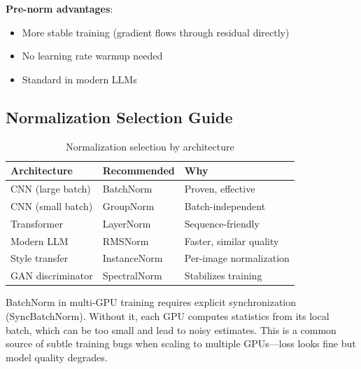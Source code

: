 \textbf{Pre-norm advantages}:
\begin{itemize}
    \item More stable training (gradient flows through residual directly)
    \item No learning rate warmup needed
    \item Standard in modern LLMs
\end{itemize}

\subsection{Normalization Selection Guide}

\begin{table}[H]
\centering
\caption{Normalization selection by architecture}
\begin{tabularx}{\textwidth}{lXX}
\toprule
\textbf{Architecture} & \textbf{Recommended} & \textbf{Why} \\
\midrule
CNN (large batch) & BatchNorm & Proven, effective \\
CNN (small batch) & GroupNorm & Batch-independent \\
Transformer & LayerNorm & Sequence-friendly \\
Modern LLM & RMSNorm & Faster, similar quality \\
Style transfer & InstanceNorm & Per-image normalization \\
GAN discriminator & SpectralNorm & Stabilizes training \\
\bottomrule
\end{tabularx}
\end{table}

\begin{warningbox}
BatchNorm in multi-GPU training requires explicit synchronization (SyncBatchNorm). Without it, each GPU computes statistics from its local batch, which can be too small and lead to noisy estimates. This is a common source of subtle training bugs when scaling to multiple GPUs---loss looks fine but model quality degrades.
\end{warningbox}


